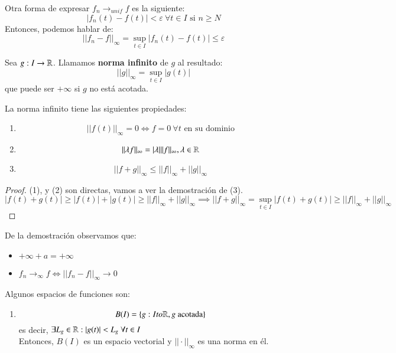 \begin{obs}
    Otra forma de expresar $f_n \to_{unif} f$ es la siguiente:
    $$
        |f_n(t) - f(t)| < \varepsilon\ \forall t \in I \text{ si } n \geq N
    $$
    Entonces, podemos hablar de:
    $$
        ||f_n - f||_{\infty} = \sup_{t\in I} |f_n(t) - f(t)| \leq \varepsilon
    $$
\end{obs}
\begin{dfn}
    Sea $g: I \to \mathbb{R}$. Llamamos \textbf{norma infinito} de $g$ al resultado:
    $$
        ||g||_{\infty} = \sup_{t\in I} |g(t)|
    $$
    que puede ser $+\infty$ si $g$ no está acotada.
\end{dfn}
\begin{pro}
    La norma infinito tiene las siguientes propiedades:
    \begin{enumerate}
        \item
        $$
            ||f(t)||_{\infty} = 0 \iff f = 0\ \forall t \text{ en su dominio}
        $$
        \item
        $$
            ||\lambda f||_\infty = |\lambda| ||f||_\infty, \lambda \in \mathbb{R}
        $$
        \item
        $$
            ||f + g||_\infty \leq ||f||_\infty + ||g||_\infty
        $$
    \end{enumerate}
\end{pro}
\begin{proof}
    (1), y (2) son directas, vamos a ver la demostración de (3).\\
    $$
        |f(t) + g(t)| \geq |f(t)| + |g(t)| \geq ||f||_\infty + ||g||_\infty \implies ||f + g||_\infty = \sup_{t \in I} |f(t) + g(t)| \geq ||f||_\infty + ||g||_\infty
    $$
\end{proof}
\begin{obs}
    De la demostración observamos que:
    \begin{itemize}
        \item $ +\infty + a = +\infty$
        \item $ f_n \to_\infty f \iff ||f_n - f||_\infty \to 0 $
    \end{itemize}
\end{obs}
\begin{eg}
    Algunos espacios de funciones son:
    \begin{enumerate}
        \item
        $$
            B(I) = \left\{ g : I to \mathbb{R}, g \text{ acotada} \right\}
        $$ es decir, $\exists L_g \in \mathbb{R} : |g(t)| < L_g\ \forall t \in I$\\
        Entonces, $B(I)$ es un espacio vectorial y $||\cdot||_\infty$ es una norma en él.
    \end{enumerate}
\end{eg}

